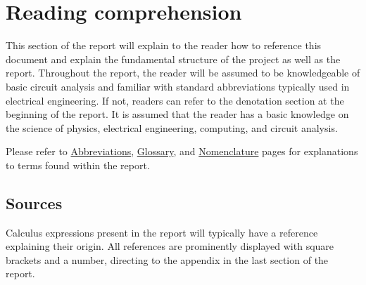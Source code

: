 \chapter*{Reading comprehension} \label{cha:report_structure} \thispagestyle{front}
This section of the report will explain to the reader how to reference this document and explain the fundamental structure of the project as well as the report. Throughout the report, the reader will be assumed to be knowledgeable of basic circuit analysis and familiar with standard abbreviations typically used in electrical engineering. If not, readers can refer to the denotation section at the beginning of the report. It is assumed that the reader has a basic knowledge on the science of physics, electrical engineering, computing, and circuit analysis.

Please refer to \hyperref[cha:abbr]{Abbreviations}, \hyperref[cha:glos]{Glossary}, and \hyperref[cha:nomenclature]{Nomenclature} pages for explanations to terms found within the report.


\section*{Sources}
Calculus expressions present in the report will typically have a reference explaining their origin. All references are prominently displayed with square brackets and a number, directing to the appendix in the last section of the report.

